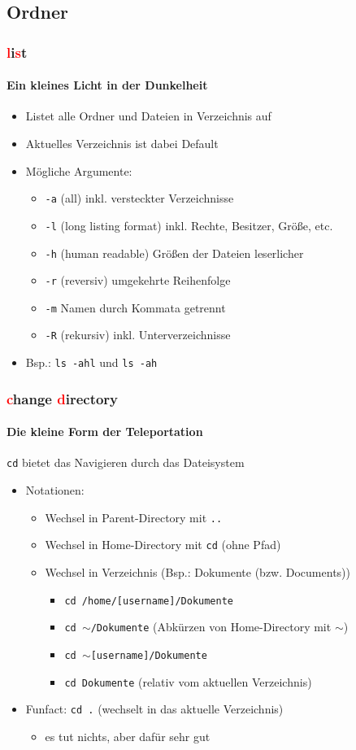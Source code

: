 \documentclass[12pt,utf8, handout]{beamer}
\begin{document}
\subsection{Ordner}
\begin{frame}
\frametitle{\textcolor{red}{l}i\textcolor{red}{s}t}
\framesubtitle{\textcolor{ownDarkOr}{Ein kleines Licht in der Dunkelheit}}
\begin{itemize}
	\item Listet alle Ordner und Dateien in Verzeichnis auf
	\item Aktuelles Verzeichnis ist dabei Default
	\item Mögliche Argumente:
	\begin{itemize}[<+->]
		\item \texttt{-a}  (all) inkl. versteckter Verzeichnisse
		\item \texttt{-l}  (long listing format) inkl. Rechte, Besitzer, Größe, etc.
		\item \texttt{-h}  (human readable) Größen der Dateien leserlicher
		\item \texttt{-r}  (reversiv) umgekehrte Reihenfolge
		\item \texttt{-m}  Namen durch Kommata getrennt
		\item \texttt{-R}  (rekursiv) inkl. Unterverzeichnisse
	\end{itemize}
	\item Bsp.: \texttt{ls -ahl} und \texttt{ls -ah}
\end{itemize}
\end{frame}

\begin{frame}
\frametitle{\textcolor{red}{c}hange \textcolor{red}{d}irectory}
\framesubtitle{\textcolor{ownDarkOr}{Die kleine Form der Teleportation}}
\texttt{cd} bietet das Navigieren durch das Dateisystem
\begin{itemize}[<+->]
	\item Notationen:	
	\begin{itemize}[<+->]
		\item Wechsel in Parent-Directory mit \texttt{..}
		\item Wechsel in Home-Directory mit \texttt{cd}   (ohne Pfad)
		\item Wechsel in Verzeichnis (Bsp.: Dokumente (bzw. Documents))
		\begin{itemize}[<+->]
			\item \texttt{cd /home/[username]/Dokumente}
			\item \texttt{cd $\sim$/Dokumente}   (Abkürzen von Home-Directory mit $\sim$)
			\item \texttt{cd $\sim$[username]/Dokumente}
			\item \texttt{cd Dokumente}    (relativ vom aktuellen Verzeichnis)
		\end{itemize}
	\end{itemize}
	\item Funfact: \texttt{cd .}  (wechselt in das aktuelle Verzeichnis)
	\begin{itemize}
		\item es tut nichts, aber dafür sehr gut
	\end{itemize}
\end{itemize}
\end{frame}
\end{document}
